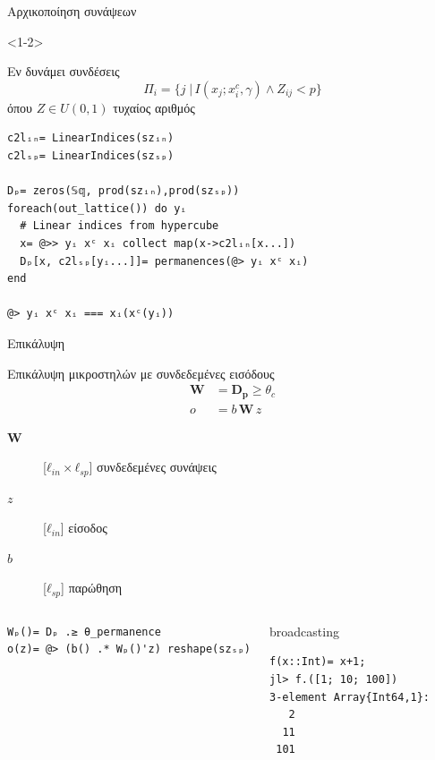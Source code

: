 \documentclass[10pt,lualatex]{beamer}
\begin{document}
\begin{frame}[fragile]{Αρχικοποίηση συνάψεων}
\begin{onlyenv}<1-2>
\begin{block}{Εν δυνάμει συνδέσεις}
  \[ Π_i= \{j \;|\, I(x_j; x_i^c, γ) \wedge Z_{ij} < p\} \]
  όπου $Ζ \in U(0,1)$ τυχαίος αριθμός
\end{block}
\pause
\begin{verbatim}
c2lᵢₙ= LinearIndices(szᵢₙ)
c2lₛₚ= LinearIndices(szₛₚ)

Dₚ= zeros(𝕊𝕢, prod(szᵢₙ),prod(szₛₚ))
foreach(out_lattice()) do yᵢ
  # Linear indices from hypercube
  x= @>> yᵢ xᶜ xᵢ collect map(x->c2lᵢₙ[x...])
  Dₚ[x, c2lₛₚ[yᵢ...]]= permanences(@> yᵢ xᶜ xᵢ)
end

@> yᵢ xᶜ xᵢ === xᵢ(xᶜ(yᵢ))
\end{verbatim}
\end{onlyenv}

\end{frame}

\begin{frame}[fragile]{Επικάλυψη}
\begin{block}{Επικάλυψη μικροστηλών με συνδεδεμένες εισόδους}
  \begin{align*}
    \mathbf{W} &= \mathbf{D_p} \ge θ_c\\
    o &= b\,\mathbf{W}\,z
  \end{align*}
  \vspace{-2.2\topsep}
  \begin{description}
  \item[$\mathbf{W}$] [$ℓ_{in} × ℓ_{sp}$] συνδεδεμένες συνάψεις
  \item[$z$] [$ℓ_{in}$] είσοδος
  \item[$b$] [$ℓ_{sp}$] παρώθηση
  \end{description}
\end{block}
\pause
\begin{columns}[T]
\begin{verbatim}
Wₚ()= Dₚ .≥ θ_permanence
o(z)= @> (b() .* Wₚ()'z) reshape(szₛₚ)
\end{verbatim}
\pause
{}
\begin{block}{broadcasting}
\begin{verbatim}
f(x::Int)= x+1;
jl> f.([1; 10; 100])
3-element Array{Int64,1}:
   2
  11
 101
\end{verbatim}
\end{block}
\end{columns}
\end{frame}
\end{document}
